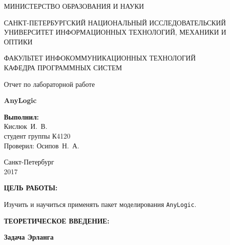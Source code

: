 \documentclass[14pt,a4paper]{extreport}
\newcommand{\header}[1]{%
{
\clearpage%
\fontsize{16pt}{14pt}\selectfont
\begin{center}
\textbf{\MakeUppercase{#1}:}
\end{center}
}
}
\newcommand{\anylogic}{\texttt{AnyLogic}}
\newcommand{\labyear}{2017}
\newcommand{\labtitle}{AnyLogic}
\newcommand{\prepod}{Осипов~Н.~А.}
\newcommand{\student}{Кислюк~И.~В.}
\begin{document}
	\begin{titlepage}
	\begin{center}	
		\fontsize{14pt}{14pt}\selectfont
		МИНИСТЕРСТВО ОБРАЗОВАНИЯ И НАУКИ\\

		\vspace*{0.6\baselineskip}

		\MakeUppercase{Санкт-Петербургский Национальный Исследовательский Университет Информационных технологий, механики и оптики}		
		
		\vspace*{0.6\baselineskip}
		\MakeUppercase{Факультет Инфокоммуникационных технологий}\\
		\MakeUppercase{Кафедра программных систем}
	
		\vspace*{7\baselineskip}
		\fontsize{19pt}{18pt}\selectfont
		Отчет по лабораторной работе
		
		\fontsize{20pt}{18pt}\selectfont
		\textbf{\labtitle}\\
		\vspace*{1.15\baselineskip}
		\end{center}
	
	\vspace*{2\baselineskip}
	\begin{flushright}
	\fontsize{14pt}{14pt}\selectfont
	\textbf{Выполнил:}\\
	\student\\
	студент группы К4120\\
	Проверил: \prepod\\
	\end{flushright}
	
	\vspace{\fill}
	\begin{center}
	Санкт-Петербург\\
	\vspace{-1ex}
	\labyear
	\end{center}
	
\end{titlepage}

\fontsize{14pt}{14pt}\selectfont

\header{Цель работы}

Изучить и научиться применять пакет моделирования \anylogic.

\header{Теоретическое введение}

\begin{center}
\textbf{Задача Эрланга}
\end{center}
\end{document}
